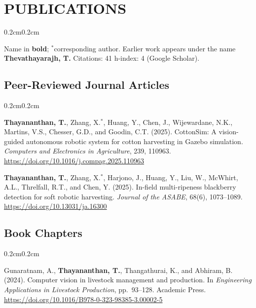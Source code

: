 \documentclass[10pt, letterpaper]{article}
\newcommand{\textbfr}[1]{\textbf{#1}}
\newenvironment{onecolentry}{%
    \begin{adjustwidth}{0.2cm}{0.2cm}
}{\end{adjustwidth}}
\newenvironment{pubsJ}{%
  \begin{enumerate}[label={[J\arabic*]}, leftmargin=1.15cm, labelsep=0.2cm,
                    topsep=0.08cm, parsep=0.08cm, partopsep=0pt, itemsep=0pt]
}{\end{enumerate}}
\newenvironment{pubsB}{%
  \begin{enumerate}[label={[B\arabic*]}, leftmargin=1.15cm, labelsep=0.2cm,
                    topsep=0.08cm, parsep=0.08cm, partopsep=0pt, itemsep=0pt]
}{\end{enumerate}}
\begin{document}
\section{PUBLICATIONS}
\vspace{0.04cm}
\begin{onecolentry}
    {\footnotesize Name in \textbf{bold}; $^{*}$corresponding author.
    Earlier work appears under the name \textbf{Thevathayarajh, T.}
    Citations: 41 \textbar{} h-index: 4 (Google Scholar).\par}
\end{onecolentry}
\vspace{0.12cm}

\subsection{Peer-Reviewed Journal Articles}
\begin{onecolentry}
\begin{pubsJ}
    \item \textbfr{Thayananthan, T.}, Zhang, X.$^{*}$, Huang, Y., Chen, J.,
    Wijewardane, N.K., Martins, V.S., Chesser, G.D., and Goodin, C.T. (2025).
    CottonSim: A vision-guided autonomous robotic system for cotton harvesting in
    Gazebo simulation. \emph{Computers and Electronics in Agriculture}, 239, 110963.
    \url{https://doi.org/10.1016/j.compag.2025.110963}

    \item \textbfr{Thayananthan, T.}, Zhang, X.$^{*}$, Harjono, J., Huang, Y., Liu, W.,
    McWhirt, A.L., Threlfall, R.T., and Chen, Y. (2025). In-field multi-ripeness
    blackberry detection for soft robotic harvesting. \emph{Journal of the ASABE},
    68(6), 1073--1089. \url{https://doi.org/10.13031/ja.16300}
\end{pubsJ}
\end{onecolentry}
\vspace{0.12cm}

\subsection{Book Chapters}
\begin{onecolentry}
\begin{pubsB}
    \item Gunaratnam, A., \textbfr{Thayananthan, T.}, Thangathurai, K., and
    Abhiram, B. (2024). Computer vision in livestock management and production.
    In \emph{Engineering Applications in Livestock Production}, pp.~93--128.
    Academic Press. \url{https://doi.org/10.1016/B978-0-323-98385-3.00002-5}
\end{pubsB}
\end{onecolentry}
\vspace{0.12cm}
\end{document}
